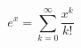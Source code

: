     \begin{center}
        \begin{equation*}
            e^x = \sum_{k=0}^{\infty} \frac{x^k}{k!}
        \end{equation*}
    \end{center}
